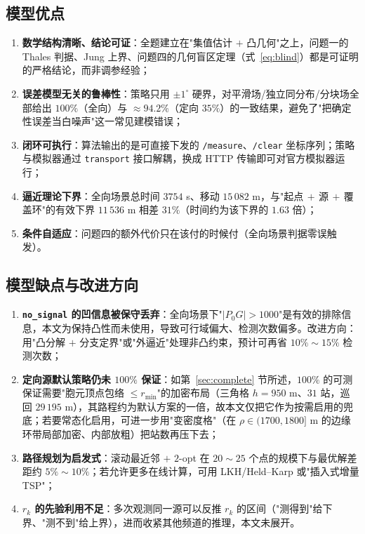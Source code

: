 \subsection{模型优点}

\begin{enumerate}
  \item \textbf{数学结构清晰、结论可证}：全题建立在"集值估计 $+$ 凸几何"之上，问题一的 Thales 判据、Jung 上界、问题四的几何盲区定理（式~\eqref{eq:blind}）都是可证明的严格结论，而非调参经验；
  \item \textbf{误差模型无关的鲁棒性}：策略只用 $\pm1^\circ$ 硬界，对平滑场/独立同分布/分块场全部给出 $100\%$（全向）与 $\approx94.2\%$（定向 $35\%$）的一致结果，避免了"把确定性误差当白噪声"这一常见建模错误；
  \item \textbf{闭环可执行}：算法输出的是可直接下发的 \texttt{/measure}、\texttt{/clear} 坐标序列；策略与模拟器通过 \texttt{transport} 接口解耦，换成 HTTP 传输即可对官方模拟器运行；
  \item \textbf{逼近理论下界}：全向场景总时间 $3754$ s、移动 $15\,082$ m，与"起点$\,+\,$源$\,+\,$覆盖环"的有效下界 $11\,536$ m 相差 $31\%$（时间约为该下界的 $1.63$ 倍）；
  \item \textbf{条件自适应}：问题四的额外代价只在该付的时候付（全向场景判据零误触发）。
\end{enumerate}

\subsection{模型缺点与改进方向}

\begin{enumerate}
  \item \textbf{\texttt{no\_signal} 的凹信息被保守丢弃}：全向场景下"$|P_0G|>1000$"是有效的排除信息，本文为保持凸性而未使用，导致可行域偏大、检测次数偏多。改进方向：用"凸分解 $+$ 分支定界"或"外逼近"处理非凸约束，预计可再省 $10\%\!\sim\!15\%$ 检测次数；
  \item \textbf{定向源默认策略仍未 $100\%$ 保证}：如第~\ref{sec:complete} 节所述，$100\%$ 的可测保证需要"胞元顶点包络 $\le r_{\min}$"的加密布局（三角格 $h=950$ m、$31$ 站，巡回 $29\,195$ m），其路程约为默认方案的一倍，故本文仅把它作为按需启用的兜底；若要常态化启用，可进一步用"变密度格"（在 $\rho\in(1700,1800]$ m 的边缘环带局部加密、内部放粗）把站数再压下去；
  \item \textbf{路径规划为启发式}：滚动最近邻 $+$ $2$-opt 在 $20\!\sim\!25$ 个点的规模下与最优解差距约 $5\%\!\sim\!10\%$；若允许更多在线计算，可用 LKH/Held--Karp 或"插入式增量 TSP"；
  \item \textbf{$r_k$ 的先验利用不足}：多次观测同一源可以反推 $r_k$ 的区间（"测得到"给下界、"测不到"给上界），进而收紧其他频道的推理，本文未展开。
\end{enumerate}


